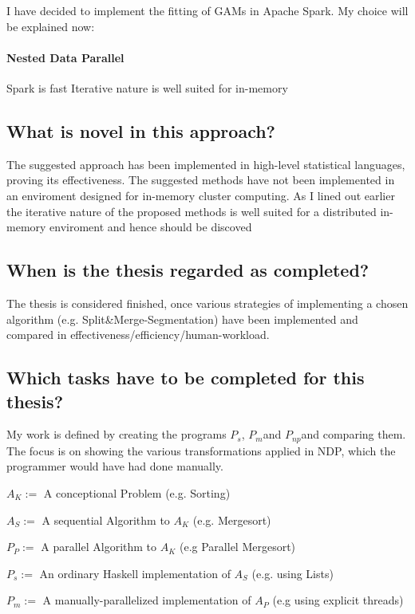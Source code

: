 \documentclass{article}
\newcommand{\seq}[0]{$P_{s}$}
\renewcommand{\mp}[0]{$P_{m}$}
\newcommand{\ndp}[0]{$P_{np}$}
\newcommand{\note}[1]{{\tiny (#1)}}
\newcommand{\algo}[0]{Split\&Merge-Segmentation}
\begin{document}
\begin{itemize}
    I have decided to implement the fitting of GAMs in Apache Spark. My choice will be explained now:
    \paragraph{Nested Data Parallel}
        Spark is fast
        Iterative nature is well suited for in-memory



    \subsection{What is novel in this approach?}
    The suggested approach has been implemented in high-level statistical languages, proving its effectiveness. The suggested methods have not been implemented in an enviroment designed for in-memory cluster computing. As I lined out earlier the iterative nature of the proposed methods is well suited for a distributed in-memory enviroment and hence should be discoved

    \subsection{When is the thesis regarded as completed?}
    The thesis is considered finished, once various strategies of
    implementing a chosen algorithm (e.g. \algo) have been
    implemented and compared in effectiveness/efficiency/human-workload.

    \subsection{Which tasks have to be completed for this thesis?}
    My work is defined by creating the programs \seq, \mp and \ndp and comparing them.
    The focus is on showing the various transformations applied in NDP, which the programmer would have had done manually.

        $A_{K} :=$ A conceptional Problem \note{e.g. Sorting}

        $A_{S} :=$ A sequential Algorithm to $A_{K}$ \note{e.g. Mergesort}

        $P_{P} :=$ A parallel Algorithm to $A_{K}$ \note{e.g Parallel Mergesort}

        \seq $:=$ An ordinary Haskell implementation of $A_{S}$ \note{e.g. using Lists}

        \mp $:=$ A manually-parallelized implementation of $A_{P}$ \note{e.g using explicit threads}


\end{itemize}
\end{document}
